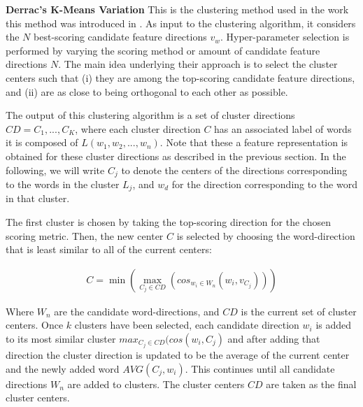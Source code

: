 




\noindent \textbf{Derrac's K-Means Variation} This is the clustering method used in the work this method was introduced in \cite{Derrac2015}.  As input to the clustering algorithm, it considers the $N$ best-scoring candidate feature directions $v_w$. Hyper-parameter selection is performed by varying the scoring method or amount of candidate feature directions $N$. The main idea underlying their approach is to select the cluster centers such that (i) they are among the top-scoring candidate feature directions, and (ii) are as close to being orthogonal to each other as possible. 
 
 
The output of this clustering algorithm is a set of cluster directions ${CD} = C_1,...,C_K$, where each cluster direction $C$ has an associated label of words it is composed of  $L(w_1, w_2, ..., w_n)$. Note that these a feature representation is obtained for these cluster directions as described in the previous section. In the following, we will write   ${C}_j$  to denote the centers of the directions corresponding to the words in the cluster $L_j$, and $w_d$ for the direction corresponding to the word in that cluster.

The first cluster  is chosen by taking the top-scoring direction for the chosen scoring metric. Then, the new center $C$ is selected by choosing the word-direction that is least similar to all of the current centers:



\begin{align}
C = \min(\max_{C_j \in {CD}}({cos_{w_i \in W_n}(w_i, v_{C_j})}))
\end{align}


Where $W_n$ are the candidate word-directions, and $CD$ is the current set of cluster centers. Once $k$ clusters have been selected,  each candidate direction $w_i$  is added to its most similar cluster $max_{C_j \in {CD}}(cos(w_i, C_j)$ and after adding that direction the cluster direction is updated to be the average of the current center and the newly added word ${AVG}(C_j, w_i)$. This continues until all candidate directions $W_n$ are added to clusters. The cluster centers $CD$ are taken as the final cluster centers.


